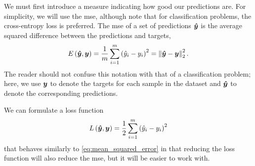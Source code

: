 \documentclass[../main.tex]{subfiles}
\begin{document}
We must first introduce a measure indicating how good our predictions are.
For simplicity, we will use the \gls{mse}, although note that for classification problems, the cross-entropy loss is preferred.
The \gls{mse} of a set of predictions ${\bm{\hat{y}}}$ is the average squared difference between the predictions and targets,
\begin{equation}
    \label{eq:mean_squared_error}
    E\left( {\bm{\hat{y}}}, {\bm{y}} \right) = \frac{1}{m} \sum_{i=1}^m{\left(\hat{y}_i - y_i\right)^2} = \left\lVert{\bm{\hat{y}}}-{\bm{y}}\right\rVert_2^2.
\end{equation}
The reader should not confuse this notation with that of a classification problem; here, we use ${\bm{y}}$ to denote the targets for each sample in the dataset and ${\bm{\hat{y}}}$ to denote the corresponding predictions.

We can formulate a loss function
\begin{equation}
    \label{eq:mse}
    L\left( {\bm{\hat{y}}}, {\bm{y}} \right) = \frac{1}{2} \sum_{i=1}^m{\left(\hat{y}_i - y_i\right)^2}
\end{equation}
that behaves similarly to \cref{eq:mean_squared_error} in that reducing the loss function will also reduce the \gls{mse}, but it will be easier to work with.
\end{document}
